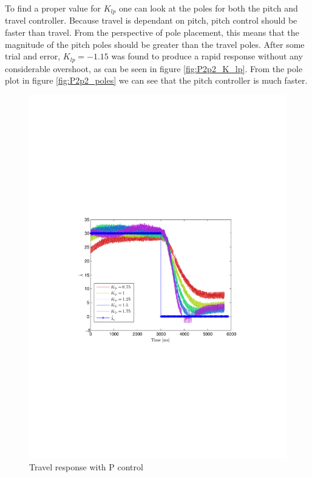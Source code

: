 To find a proper value for $K_{lp}$ one can look at the poles for both the pitch and travel controller. Because travel is dependant on pitch, pitch control should be faster than travel. From the perspective of pole placement, this means that the magnitude of the pitch poles should be greater than the travel poles.
After some trial and error, $K_{lp} = -1.15$ was found to produce a rapid response without any considerable overshoot, as can be seen in figure \cref{fig:P2p2_K_lp}. From the pole plot in figure \cref{fig:P2p2_poles} we can see that the pitch controller is much faster.
\begin{figure}[!!ht!!!!!!!!tb!!]
    \begin{minipage}{0.5\textwidth}
    	\centering
		\includegraphics[width=1\textwidth,trim={4cm 9cm 4cm 9cm},clip]{figures/P2p2_Klp.pdf}
    	\caption{Travel response with P control}
	\end{minipage}

\end{figure}

